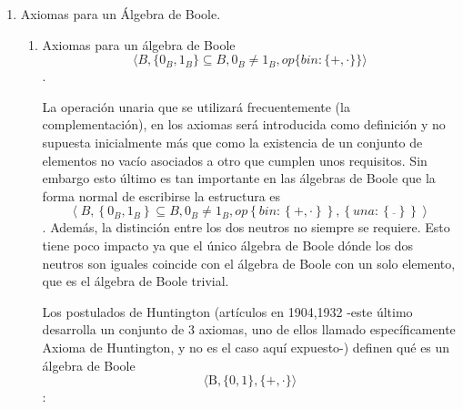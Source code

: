\begin{enumerate}
\begin{enumerate}
    cuantificador univer\-sal (que evitaremos en lo posible) no
    pondremos ningún símbolo de forma que, cuando aparezca una variable
    o conjunto o constante sin haber sido cuantificada supondremos que
    se aplica el cuantificador universal a la variable o constante
    situándolo dentro de \[B\]. Si el cuantificador universal debiera
    aplicarse a una variable sobre otro conjunto subconjunto del \[B\]
    se omitirá el cuantificador universal pero se precederá la sentencia
    con una indicación sobre la pertenencia del elemento. Para cualquier
    elemento en el que no aparezca su pertenencia es porque pertenece al
    universal \[B\]. Al igual, cuando una variable que asume un valor
    que es un conjunto este será parte de
    \[{\wp{(B)}} \smallsetminus \left\{ \varnothing \right\}\], que no
    aparecerá de forma explícita. Para las variable conjunto se repite
    todo lo anterior con la diferencia de cambiar \[B\] por
    \[\langle{B,{{\{{0_{B},1_{B}}\}} \subseteq B},{0_{B} \neq 1_{B}},{\mathit{op}{\{{\mathit{bin}:{\{{+ , \cdot}\}}}\}}}}\rangle\].
  \end{enumerate}
\item
  Axiomas para un Álgebra de Boole.

  \begin{enumerate}
  \def\labelenumii{\arabic{enumii}.}
  \item
    Axiomas para un álgebra de Boole
    \[\langle{B,{{\{{0_{B},1_{B}}\}} \subseteq B},{0_{B} \neq 1_{B}},{\mathit{op}{\{{\mathit{bin}:{\{{+ , \cdot}\}}}\}}}}\rangle\].

    La operación unaria que se utilizará frecuentemente (la
    complementación), en los axio\-mas será introducida como definición
    y no supuesta inicialmente más que como la exis\-tencia de un
    conjunto de elementos no vacío asociados a otro que cumplen unos
    requisi\-tos. Sin embargo esto último es tan importante en las
    álgebras de Boole que la forma normal de escribirse la estructura es
    \[\left\langle {B,{\left\{ {0_{B},1_{B}} \right\} \subseteq B},{0_{B} \neq 1_{B}},{\mathit{op}\left\{ {\mathit{bin}:\left\{ {+ , \cdot} \right\}} \right\},\left\{ {\mathit{una}:\left\{ \overline{} \right\}} \right\}}} \right\rangle\].
    Además, la distinción entre los dos neutros no siempre se requiere.
    Esto tiene poco impacto ya que el único álgebra de Boole dónde los
    dos neutros son iguales coincide con el álgebra de Boole con un solo
    elemento, que es el álgebra de Boole trivial.

    Los postulados de Huntington (artículos en 1904,1932 -este último
    desarrolla un con\-junto de 3 axiomas, uno de ellos llamado
    específicamente Axioma de Huntington, y no es el caso aquí
    expuesto-) definen qué es un álgebra de Boole
    \[\langle{\mathtt{\mathrm{B}},{\{{\mathtt{\mathrm{0}},\mathtt{\mathrm{1}}}\}},{\{{+ , \cdot}\}}}\rangle\]:


\end{enumerate}
\end{enumerate}
